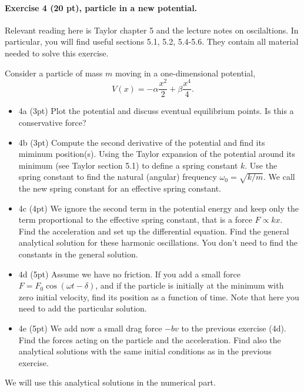 \documentclass[%
oneside,                 %
final,                   %
10pt]{article}
\begin{document}
\noindent
\paragraph{Exercise 4 (20 pt), particle in a new potential.}
Relevant reading here is Taylor chapter 5 and the lecture notes on oscilaltions. In particular, you will find useful  sections 5.1, 5.2, 5.4-5.6. They contain all material needed to solve this exercise.

Consider a particle of mass $m$ moving in a one-dimensional potential,
\[
V(x)=-\alpha\frac{x^2}{2}+\beta\frac{x^4}{4}.
\]

\begin{itemize}
\item 4a (3pt) Plot the potential and discuss eventual equilibrium points. Is this a conservative force?

\item 4b (3pt) Compute the second derivative of the potential and find its miminum position(s). Using the Taylor expansion of the potential around its minimum (see Taylor section 5.1) to define a spring constant $k$. Use the spring constant to find the natural (angular) frequency $\omega_0=\sqrt{k/m}$. We call the new spring constant for  an effective spring constant. 

\item 4c (4pt) We ignore the second term in the potential energy and keep only the term proportional to the effective spring constant, that is a force $F\propto kx$. Find the acceleration and set up the differential equation.  Find the general analytical solution for these harmonic oscillations.  You don't need to find the constants in the general solution.

\item 4d (5pt) Assume we have no friction. If you add a small force $F=F_0\cos{(\omega t-\delta)}$, and if the particle is initially at the minimum with zero initial velocity, find its position as a function of time. Note that here you need to add the particular solution. 

\item 4e (5pt) We add now  a small drag force $-bv$ to the previous exercise (4d). Find the forces acting on the particle and the acceleration. Find also the analytical solutions with the same initial conditions as in the previous exercise.
\end{itemize}

\noindent
We will use this analytical solutions in the numerical part.
\end{document}
